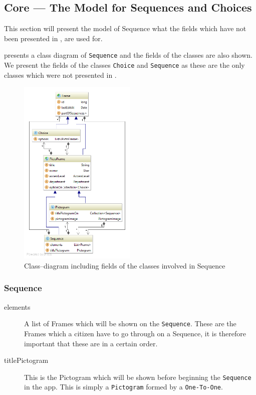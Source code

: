 \subsection{Core --- The Model for Sequences and Choices}\label{subsec:seqcore}

This section will present the model of Sequence what the fields which have not been presented in , are used for.

 presents a class diagram of \texttt{Sequence} and the fields of the classes are also shown.
We present the fields of the classes \texttt{Choice} and \texttt{Sequence} as these are the only classes which were not presented in .

\begin{figure}[h]
    \centering
    \includegraphics[width=0.5\textwidth]{figures/diagram-sequence-with-fields.png}
    \caption{Class--diagram including fields of the classes involved in Sequence}\label{fig:sequencemodel}
\end{figure}


\subsubsection{Sequence}
\begin{description}
	\item[elements] A list of Frames which will be shown on the \texttt{Sequence}.
	These are the Frames which a citizen have to go through on a Sequence, it is therefore important that these are in a certain order.
	\item[titlePictogram] This is the Pictogram which will be shown before beginning the \texttt{Sequence} in the app.
	This is simply a \texttt{Pictogram} formed by a \texttt{One-To-One}.
\end{description}

